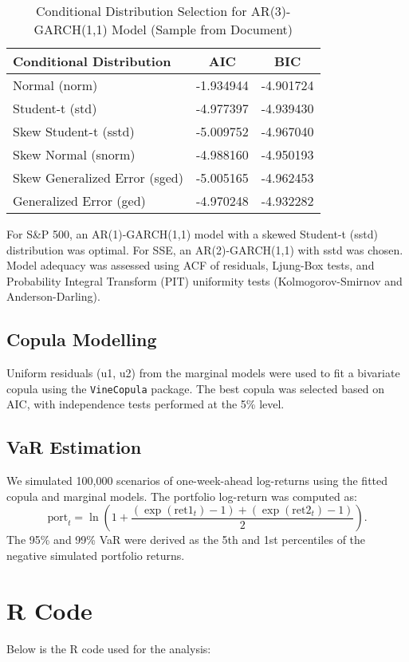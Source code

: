 \documentclass[a4paper,10pt]{article}
\begin{document}
\begin{table}[h]
    \centering
    \caption{Conditional Distribution Selection for AR(3)-GARCH(1,1) Model (Sample from Document)}
    \label{tab:dist}
    \begin{tabular}{lcc}
        \toprule
        Conditional Distribution & AIC & BIC \\
        \midrule
        Normal (norm) & -1.934944 & -4.901724 \\
        Student-t (std) & -4.977397 & -4.939430 \\
        Skew Student-t (sstd) & -5.009752 & -4.967040 \\
        Skew Normal (snorm) & -4.988160 & -4.950193 \\
        Skew Generalized Error (sged) & -5.005165 & -4.962453 \\
        Generalized Error (ged) & -4.970248 & -4.932282 \\
        \bottomrule
    \end{tabular}
\end{table}

For S\&P 500, an AR(1)-GARCH(1,1) model with a skewed Student-t (sstd) distribution was optimal. For SSE, an AR(2)-GARCH(1,1) with sstd was chosen. Model adequacy was assessed using ACF of residuals, Ljung-Box tests, and Probability Integral Transform (PIT) uniformity tests (Kolmogorov-Smirnov and Anderson-Darling).

\subsection{Copula Modelling}
Uniform residuals (u1, u2) from the marginal models were used to fit a bivariate copula using the \texttt{VineCopula} package. The best copula was selected based on AIC, with independence tests performed at the 5\% level.

\subsection{VaR Estimation}
We simulated 100,000 scenarios of one-week-ahead log-returns using the fitted copula and marginal models. The portfolio log-return was computed as:
\[
\text{port}_t = \ln\left(1 + \frac{(\exp(\text{ret1}_t) - 1) + (\exp(\text{ret2}_t) - 1)}{2}\right).
\]
The 95\% and 99\% VaR were derived as the 5th and 1st percentiles of the negative simulated portfolio returns.

\section{R Code}
Below is the R code used for the analysis:
\end{document}
